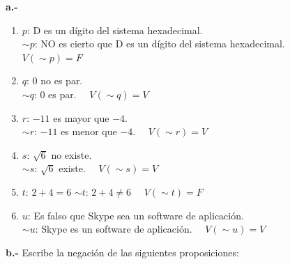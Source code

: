 \documentclass[12pt]{article}
\begin{document}
\textbf{a.-}
\begin{enumerate}[label=\roman*)]
    \item $p$: D es un dígito del sistema hexadecimal.\\
          $\sim p$: NO es cierto que D es un dígito del sistema hexadecimal.\\
          $V(\sim p) = F$

    \item $q$: 0 no es par.\\
          $\sim q$: 0 es par. $\quad V(\sim q) = V$

    \item $r$: $-11$ es mayor que $-4$.\\
          $\sim r$: $-11$ es menor que $-4$. $\quad V(\sim r) = V$

    \item $s$: $\sqrt{6}$ no existe.\\
          $\sim s$: $\sqrt{6}$ existe. $\quad V(\sim s) = V$

    \item $t$: $2 + 4 = 6$ \quad $\sim t$: $2 + 4 \neq 6$ $\quad V(\sim t) = F$

    \item $u$: Es falso que Skype sea un software de aplicación.\\
          $\sim u$: Skype es un software de aplicación. $\quad V(\sim u) = V$
\end{enumerate}

\textbf{b.-} Escribe la negación de las siguientes proposiciones:
\end{document}
